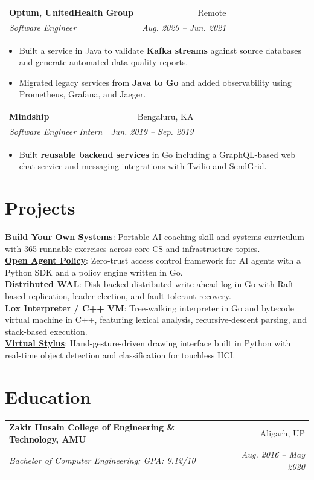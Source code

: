 \documentclass[letterpaper,10pt]{article}
\makeatletter
\newenvironment{resumeList}{
  \begin{itemize}[
    leftmargin=0.22in,
    label=\textbullet,
    itemsep=2pt,
    topsep=2.5pt,
    parsep=0pt,
    partopsep=0pt
  ]
}{
  \end{itemize}
  \vspace{0pt}
}
\newcommand{\resumeSubheading}[4]{
  \vspace{3pt}
  \begin{tabular*}{\textwidth}{l@{\extracolsep{\fill}}r}
    \textbf{#1} & #2 \\
    \textit{#3} & \textit{#4} \\
  \end{tabular*}
  \vspace{-5pt}
}
\makeatother
\begin{document}
\resumeSubheading
  {Optum, UnitedHealth Group}{Remote}
  {Software Engineer}{Aug. 2020 -- Jun. 2021}
\begin{resumeList}
  \item Built a service in Java to validate \textbf{Kafka streams} against source databases and generate automated data quality reports.
  \item Migrated legacy services from \textbf{Java to Go} and added observability using Prometheus, Grafana, and Jaeger.
\end{resumeList}

\resumeSubheading
  {Mindship}{Bengaluru, KA}
  {Software Engineer Intern}{Jun. 2019 -- Sep. 2019}
\begin{resumeList}
  \item Built \textbf{reusable backend services} in Go including a GraphQL-based web chat service and messaging integrations with Twilio and SendGrid.
\end{resumeList}

\section{Projects}
\textbf{\href{https://github.com/proishan11/build-your-own-systems}{Build Your Own Systems}}: Portable AI coaching skill and systems curriculum with 365 runnable exercises across core CS and infrastructure topics. \\[2pt]
\textbf{\href{https://github.com/proishan11/open-agent-policy}{Open Agent Policy}}: Zero-trust access control framework for AI agents with a Python SDK and a policy engine written in Go. \\[2pt]
\textbf{\href{https://github.com/proishan11/gowal}{Distributed WAL}}: Disk-backed distributed write-ahead log in Go with Raft-based replication, leader election, and fault-tolerant recovery. \\[2pt]
\textbf{Lox Interpreter / C++ VM}: Tree-walking interpreter in Go and bytecode virtual machine in C++, featuring lexical analysis, recursive-descent parsing, and stack-based execution. \\[2pt]
\textbf{\href{https://github.com/proishan11/VirtualStylus}{Virtual Stylus}}: Hand-gesture-driven drawing interface built in Python with real-time object detection and classification for touchless HCI.

\section{Education}
\resumeSubheading
  {Zakir Husain College of Engineering \& Technology, AMU}{Aligarh, UP}
  {Bachelor of Computer Engineering; GPA: 9.12/10}{Aug. 2016 -- May 2020}

\end{document}
